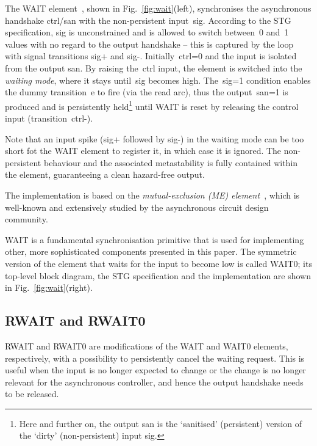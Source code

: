 \documentclass[conference]{IEEEtran}
\begin{document}
The \textsf{WAIT} element~\cite{2015_sokolov_multiphase}, shown in Fig.~\ref{fig:wait}(left),
synchronises the asynchronous handshake \textsf{ctrl/san} with the non-persistent
input~\textsf{sig}. According to the STG specification, \textsf{sig} is unconstrained and
is allowed to switch between~0 and~1 values with no regard to the output handshake -- this
is captured by the loop with signal transitions \textsf{sig+} and \textsf{sig-}.
Initially~\textsf{ctrl=0} and the input is isolated from the output \textsf{san}.
By raising the~\textsf{ctrl} input, the element is switched into the \emph{waiting mode},
where it stays until~\textsf{sig} becomes high. The~\textsf{sig=1} condition enables the dummy
transition~\textsf{e} to fire (via the read arc), thus the output~\textsf{san=1} is produced
and is persistently held\footnote{Here and further on, the output \textsf{san}
is the `sanitised' (persistent) version of the `dirty' (non-persistent) input \textsf{sig}.}
until \textsf{WAIT} is reset by releasing the control input (transition~\textsf{ctrl-}).

Note that an input spike (\textsf{sig+} followed by \textsf{sig-}) in the waiting
mode can be too short fot the \textsf{WAIT} element to register it, in which case it is
ignored. The non-persistent behaviour and the associated metastability is fully contained
within the element, guaranteeing a clean hazard-free output.

The implementation is based on the \emph{mutual-exclusion (ME)
element}~\cite{2008_kinniment_synchronisation}, which is well-known and extensively
studied by the asynchronous circuit design community.

\textsf{WAIT} is a fundamental synchronisation primitive that is used for
implementing other, more sophisticated components presented in this paper.
The symmetric version of the element that waits for the input to become low is
called \textsf{WAIT0}; its top-level block diagram, the STG specification and
the implementation are shown in Fig.~\ref{fig:wait}(right).

\subsection{\textsf{RWAIT} and \textsf{RWAIT0}}

\textsf{RWAIT} and \textsf{RWAIT0} are modifications of the \textsf{WAIT} and \textsf{WAIT0}
elements, respectively, with a possibility to persistently cancel the waiting request. This
is useful when the input is no longer expected to change or the change is no longer relevant
for the asynchronous controller, and hence the output handshake needs to be released.
\end{document}
